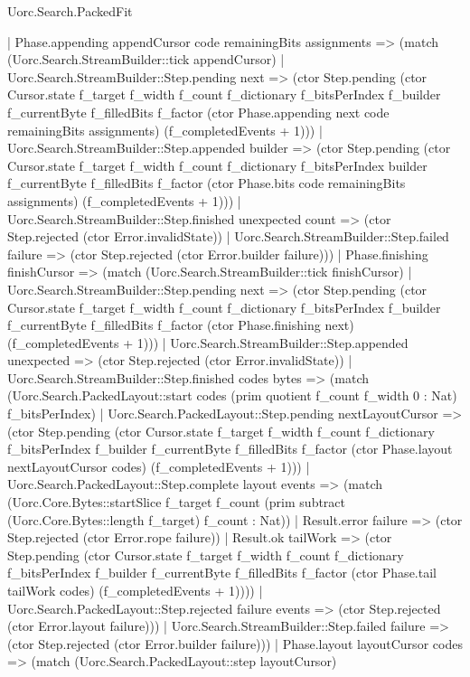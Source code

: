 \begin{lexlean}{Uorc.Search.PackedFit}
\begin{semanticmodule}
{      | Phase.appending appendCursor code remainingBits assignments => (match (Uorc.Search.StreamBuilder::tick appendCursor)
        | Uorc.Search.StreamBuilder::Step.pending next => (ctor Step.pending (ctor Cursor.state f_target f_width f_count f_dictionary f_bitsPerIndex f_builder f_currentByte f_filledBits f_factor (ctor Phase.appending next code remainingBits assignments) (f_completedEvents + 1)))
        | Uorc.Search.StreamBuilder::Step.appended builder => (ctor Step.pending (ctor Cursor.state f_target f_width f_count f_dictionary f_bitsPerIndex builder f_currentByte f_filledBits f_factor (ctor Phase.bits code remainingBits assignments) (f_completedEvents + 1)))
        | Uorc.Search.StreamBuilder::Step.finished unexpected count => (ctor Step.rejected (ctor Error.invalidState))
        | Uorc.Search.StreamBuilder::Step.failed failure => (ctor Step.rejected (ctor Error.builder failure)))
      | Phase.finishing finishCursor => (match (Uorc.Search.StreamBuilder::tick finishCursor)
        | Uorc.Search.StreamBuilder::Step.pending next => (ctor Step.pending (ctor Cursor.state f_target f_width f_count f_dictionary f_bitsPerIndex f_builder f_currentByte f_filledBits f_factor (ctor Phase.finishing next) (f_completedEvents + 1)))
        | Uorc.Search.StreamBuilder::Step.appended unexpected => (ctor Step.rejected (ctor Error.invalidState))
        | Uorc.Search.StreamBuilder::Step.finished codes bytes => (match (Uorc.Search.PackedLayout::start codes (prim quotient f_count f_width 0 : Nat) f_bitsPerIndex)
          | Uorc.Search.PackedLayout::Step.pending nextLayoutCursor => (ctor Step.pending (ctor Cursor.state f_target f_width f_count f_dictionary f_bitsPerIndex f_builder f_currentByte f_filledBits f_factor (ctor Phase.layout nextLayoutCursor codes) (f_completedEvents + 1)))
          | Uorc.Search.PackedLayout::Step.complete layout events => (match (Uorc.Core.Bytes::startSlice f_target f_count (prim subtract (Uorc.Core.Bytes::length f_target) f_count : Nat))
            | Result.error failure => (ctor Step.rejected (ctor Error.rope failure))
            | Result.ok tailWork => (ctor Step.pending (ctor Cursor.state f_target f_width f_count f_dictionary f_bitsPerIndex f_builder f_currentByte f_filledBits f_factor (ctor Phase.tail tailWork codes) (f_completedEvents + 1))))
          | Uorc.Search.PackedLayout::Step.rejected failure events => (ctor Step.rejected (ctor Error.layout failure)))
        | Uorc.Search.StreamBuilder::Step.failed failure => (ctor Step.rejected (ctor Error.builder failure)))
      | Phase.layout layoutCursor codes => (match (Uorc.Search.PackedLayout::step layoutCursor)
}
\end{semanticmodule}
\end{lexlean}
